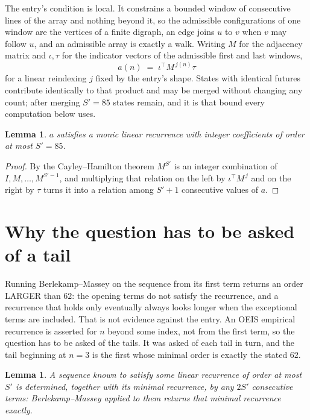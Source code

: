 \documentclass[11pt,a4paper]{article}
\theoremstyle{plain}
\newtheorem{lemma}[theorem]{Lemma}
\theoremstyle{definition}
\begin{document}
The entry's condition is local. It constrains a bounded window of consecutive lines of the
array and nothing beyond it, so the admissible configurations of one window are the vertices of
a finite digraph, an edge joins $u$ to $v$ when $v$ may follow $u$, and an admissible array is
exactly a walk. Writing $M$ for the adjacency matrix and $\iota,\tau$ for the indicator vectors
of the admissible first and last windows,
\[
a(n)\;=\;\iota^{\!\top}M^{\,j(n)}\tau
\]
for a linear reindexing $j$ fixed by the entry's shape. States with identical futures
contribute identically to that product and may be merged without changing any count; after
merging $S'=85$ states remain, and it is that bound every computation below uses.

\begin{lemma}\label{lem:cf}
$a$ satisfies a monic linear recurrence with integer coefficients of order at most $S'=85$.
\end{lemma}

\begin{proof}
By the Cayley--Hamilton theorem $M^{S'}$ is an integer combination of $I,M,\dots,M^{S'-1}$,
and multiplying that relation on the left by $\iota^{\!\top}M^{\,j}$ and on the right by
$\tau$ turns it into a relation among $S'+1$ consecutive values of $a$.
\end{proof}

\section{Why the question has to be asked of a tail}

Running Berlekamp--Massey on the sequence from its first term returns an order LARGER than $62$: the opening terms do not satisfy the recurrence, and a recurrence that holds only eventually always looks longer when the exceptional terms are included. That is not evidence against the entry. An OEIS empirical recurrence is asserted for $n$ beyond some index, not from the first term, so the question has to be asked of the tails. It was asked of each tail in turn, and the tail beginning at $n=3$ is the first whose minimal order is exactly the stated $62$.

\begin{lemma}\label{lem:bm}
A sequence known to satisfy some linear recurrence of order at most $S'$ is determined,
together with its minimal recurrence, by any $2S'$ consecutive terms: Berlekamp--Massey applied
to them returns that minimal recurrence exactly.
\end{lemma}
\end{document}
